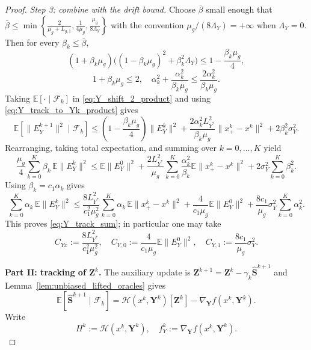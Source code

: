 \documentclass{pkumelon}
\theoremstyle{plain}
\newcommand{\E}{\mathbb{E}}
\begin{document}
\begin{proof}
\emph{Step 3: combine with the drift bound.} Choose $\bar\beta$ small enough that $\bar\beta\le \min\left\{\frac{2}{\mu_g+L_{g,1}},\frac{1}{4\mu_g},\frac{\mu_g}{8\Lambda_Y}\right\}$ with the convention $\mu_g/(8\Lambda_Y)=+\infty$ when $\Lambda_Y=0$. Then for every $\beta_k\le \bar\beta$,
\begin{equation*}
(1+\beta_k\mu_g)\bigl((1-\beta_k\mu_g)^2+\beta_k^2\Lambda_Y\bigr) \le 1-\frac{\beta_k\mu_g}{4},
\end{equation*}
\begin{equation*}
1+\beta_k\mu_g\le 2, \quad \alpha_k^2+\frac{\alpha_k^2}{\beta_k\mu_g}\le \frac{2\alpha_k^2}{\beta_k\mu_g}.
\end{equation*}
Taking $\E[\cdot\mid \mathcal F_k]$ in \eqref{eq:Y_shift_2_product} and using \eqref{eq:Y_track_to_Yk_product} gives
\begin{equation}\label{eq:Y_one_step_final_product}
\E[\|E_Y^{k+1}\|^2\mid \mathcal F_k]
\le
\left(1-\frac{\beta_k\mu_g}{4}\right)\|E_Y^k\|^2
+\frac{2\alpha_k^2L_{Y^*}^2}{\beta_k\mu_g}\|x_+^k-x^k\|^2
+2\beta_k^2\sigma_Y^2.
\end{equation}
Rearranging, taking total expectation, and summing over $k=0,\ldots,K$ yield
\begin{equation}\label{eq:Y_sum_beta_product}
\frac{\mu_g}{4}\sum_{k=0}^{K}\beta_k\,\E\|E_Y^k\|^2
\le
\E\|E_Y^0\|^2
+\frac{2L_{Y^*}^2}{\mu_g}\sum_{k=0}^{K}\frac{\alpha_k^2}{\beta_k}\E\|x_+^k-x^k\|^2
+2\sigma_Y^2\sum_{k=0}^{K}\beta_k^2.
\end{equation}
Using $\beta_k=c_1\alpha_k$ gives
\begin{equation*}
\sum_{k=0}^{K}\alpha_k\,\E\|E_Y^k\|^2 \le \frac{8L_{Y^*}^2}{c_1^2\mu_g^2}\sum_{k=0}^{K}\alpha_k\,\E\|x_+^k-x^k\|^2 +\frac{4}{c_1\mu_g}\E\|E_Y^0\|^2 +\frac{8c_1}{\mu_g}\sigma_Y^2\sum_{k=0}^{K}\alpha_k^2.
\end{equation*}
This proves \eqref{eq:Y_track_sum}; in particular one may take
\begin{equation*}
C_{Yx}:=\frac{8L_{Y^*}^2}{c_1^2\mu_g^2}, \quad C_{Y,0}:=\frac{4}{c_1\mu_g}\E\|E_Y^0\|^2, \quad C_{Y,1}:=\frac{8c_1}{\mu_g}\sigma_Y^2.
\end{equation*}

\textbf{Part II: tracking of $\boldsymbol Z^k$. }
The auxiliary update is $\boldsymbol Z^{k+1}=\boldsymbol Z^k-\gamma_k\widehat{\boldsymbol S}^{k+1}$ and Lemma~\ref{lem:unbiased_lifted_oracles} gives
\begin{equation*}
\E[\widehat{\boldsymbol S}^{k+1}\mid \mathcal F_k] = \mathcal H(x^k,\boldsymbol Y^k)[\boldsymbol Z^k]-\nabla_{\boldsymbol Y}f(x^k,\boldsymbol Y^k).
\end{equation*}
Write
\begin{equation*}
H^k:=\mathcal H(x^k,\boldsymbol Y^k), \quad f_Y^k:=\nabla_{\boldsymbol Y}f(x^k,\boldsymbol Y^k).
\end{equation*}


\end{proof}
\end{document}
